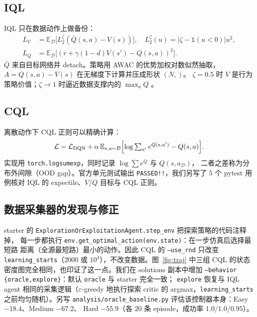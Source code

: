 \documentclass[10pt,twocolumn,a4paper]{ctexart}
\begin{document}
\subsection{IQL}
IQL 只在数据动作上做备份\citep{kostrikov2022iql}：
\begin{align}
L_V&=\mathbb{E}_{\mathcal{D}}\bigl[L_2^\zeta(\bar Q(s,a)-V(s))\bigr],\quad
L_2^\zeta(u)=|\zeta-\mathbb{1}(u<0)|u^2,\\
L_Q&=\mathbb{E}_{\mathcal{D}}\bigl[(r+\gamma(1-d)V(s')-Q(s,a))^2\bigr].
\end{align}
$\bar Q$ 来自目标网络并 detach。策略用 AWAC 的优势加权对数似然抽取，
$A=Q(s,a)-V(s)$ 在无梯度下计算并压成形状 $(N,)$\citep{nair2020awac,peng2019awr}。
$\zeta=0.5$ 时 $V$ 是行为策略价值；$\zeta\to1$ 时逼近数据支撑内的 $\max_a Q$
\citep{newey1987expectile}。

\subsection{CQL}
离散动作下 CQL 正则可以精确计算\citep{kumar2020cql}：
\begin{equation}
\mathcal{L}=\mathcal{L}_{\mathrm{DQN}}+\alpha\,\mathbb{E}_{s,a\sim\mathcal{D}}
\Bigl[\log\textstyle\sum_{a'}e^{Q(s,a')}-Q(s,a)\Bigr].
\end{equation}
实现用 \texttt{torch.logsumexp}，同时记录 $\log\sum e^{Q}$ 与 $Q(s,a_{\mathcal{D}})$，
二者之差称为分布外间隙（OOD gap）。官方单元测试输出 \texttt{PASSED!!}，我们另写了
$5$ 个 pytest 用例核对 IQL 的 expectile、$V$/$Q$ 目标与 CQL 正则。

\subsection{数据采集器的发现与修正}
starter 的 \texttt{ExplorationOrExploitationAgent.step\_env} 把探索策略的代码注释掉，
每一步都执行 \texttt{env.get\_optimal\_action(env.state)}：在一步仿真后选择最短路
距离（全源最短路）最小的动作。因此 CQL 的 \texttt{--use\_rnd} 只改变
\texttt{learning\_starts}（$2000$ 或 $10^4$），不改变数据。图~\ref{fig:traj} 中三组 CQL
的状态密度图完全相同，也印证了这一点。我们在 solutions 副本中增加
\texttt{--behavior \{oracle,explore\}}：默认 \texttt{oracle} 与 starter 完全一致；
\texttt{explore} 恢复与 IQL agent 相同的采集逻辑（$\varepsilon$-greedy 地执行探索
critic 的 argmax，\texttt{learning\_starts} 之前均匀随机）。另写
\texttt{analysis/oracle\_baseline.py} 评估该控制器本身：Easy $-18.4$、Medium $-67.2$、
Hard $-55.9$（各 $20$ 条 episode，成功率 $1.0/1.0/0.95$）。
\end{document}
